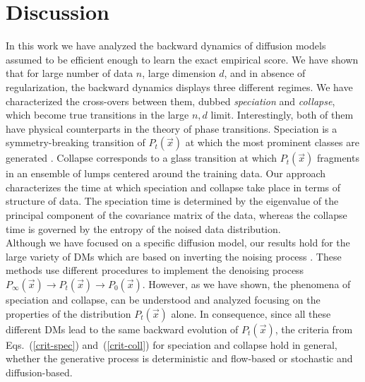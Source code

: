 \documentclass[10pt,twocolumn]{article}
\newcommand{\vx}{\vec x}
\begin{document}
\section*{Discussion}
In this work we have analyzed the backward dynamics of diffusion models assumed to be efficient enough to learn the exact empirical score. 
We have shown that for large number of data $n$, large dimension $d$, and in absence of regularization, the backward dynamics displays three different regimes. We have characterized the cross-overs between them, dubbed \emph{speciation} and \emph{collapse}, which become true transitions in the large $n,d$ limit. Interestingly, both of them have physical counterparts in the theory of phase transitions.
Speciation is a symmetry-breaking transition of $P_t(\vx)$ at which the most prominent classes are generated \cite{ambrogioni,GBM}. Collapse corresponds to a glass transition at which $P_t(\vx)$ fragments in an ensemble of lumps centered around the training data. 
Our approach characterizes the time at which speciation and collapse take place in terms of structure of data. The speciation time is determined by the eigenvalue of the principal component of the covariance matrix of the data, whereas the collapse time is governed by the entropy of the noised data distribution. \\
Although we have focused on a specific diffusion model, our results hold for the large variety of DMs which are based on inverting the noising process \cite{albergo2023stochastic}. These methods use different procedures to implement the denoising process $P_\infty(\vx) \rightarrow P_t(\vx)\rightarrow P_0 (\vx)$. 
However, as we have shown, the phenomena of speciation and collapse, can be understood and analyzed focusing on the properties of the distribution $P_t(\vx)$ alone.
In consequence, since all these different DMs lead to the same backward evolution of $P_t(\vx)$, the criteria from Eqs.~(\ref{crit-spec}) and~(\ref{crit-coll}) for speciation and collapse hold in general, whether the generative process is deterministic and flow-based or stochastic and diffusion-based.
\end{document}
